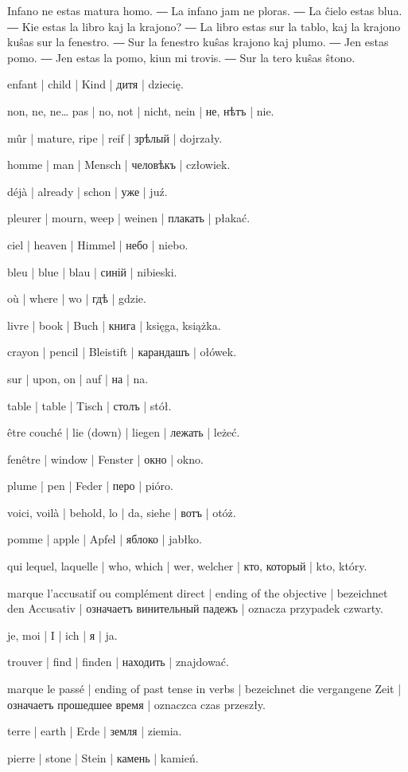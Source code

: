 
Infano ne estas matura homo. ― La infano jam ne ploras. ― La ĉielo estas blua. ― Kie estas la libro kaj la krajono? ― La libro estas sur la tablo, kaj la krajono kuŝas sur la fenestro. ― Sur la fenestro kuŝas krajono kaj plumo. ― Jen estas pomo. ― Jen estas la pomo, kiun mi trovis. ― Sur la tero kuŝas ŝtono.

\begin{ekzvocab}{1em}
 enfant | child | Kind | дитя | dziecię.

 non, ne, ne\ldots{} pas | no, not | nicht, nein | не, нѣтъ | nie.

 mûr | mature, ripe | reif | зрѣлый | dojrzały.

 homme | man | Mensch | человѣкъ | człowiek.

 déjà | already | schon | уже | juź.

 pleurer | mourn, weep | weinen | плакать | płakać.

 ciel | heaven | Himmel | небо | niebo.

 bleu | blue | blau | синій | nibieski.

 où | where | wo | гдѣ | gdzie.

 livre | book | Buch | книга | księga, książka.

 crayon | pencil | Bleistift | карандашъ | ołówek.

 sur | upon, on | auf | на | na.

 table | table | Tisch | столъ | stół.

 être couché | lie (down) | liegen | лежать | leżeć.

 fenêtre | window | Fenster | окно | okno.

 plume | pen | Feder | перо | pióro.

 voici, voilà | behold, lo | da, siehe | вотъ | otóż.

 pomme | apple | Apfel | яблоко | jabłko.

 qui lequel, laquelle | who, which | wer, welcher | кто, который | kto, który.

 marque l’accusatif ou complément direct | ending of the objective | bezeichnet den Accusativ | означаетъ винительный падежъ | oznacza przypadek czwarty.

 je, moi | I | ich | я | ja.

 trouver | find | finden | находить | znajdować.

 marque le passé | ending of past tense in verbs | bezeichnet die vergangene Zeit | означаетъ прошедшее время | oznaczca czas przeszły.

 terre | earth | Erde | земля | ziemia.

 pierre | stone | Stein | камень | kamień.

\end{ekzvocab}


